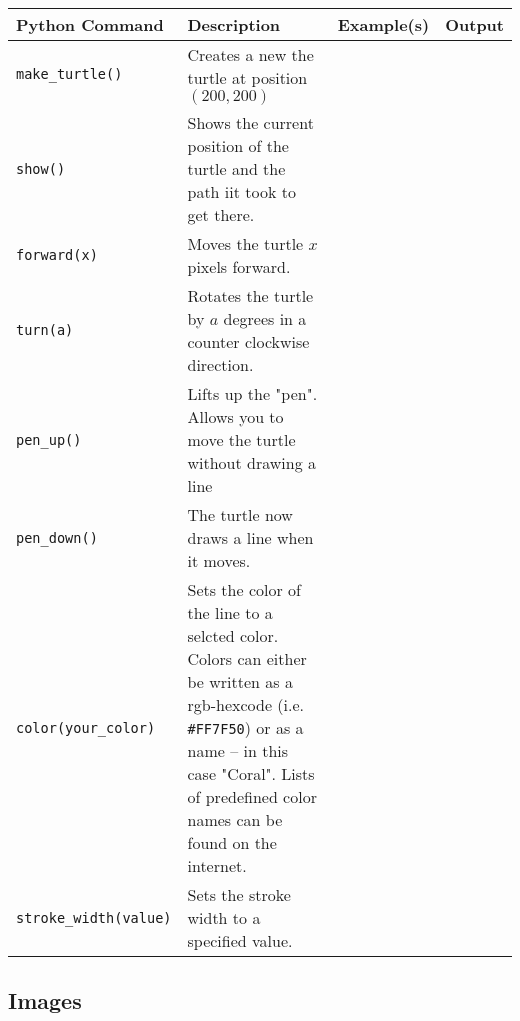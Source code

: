 \documentclass[11pt,a4paper]{report}
\begin{document}
\begin{longtable}{|p{}|p{}|p{}|p{}|}
\hline
Python Command & Description & Example(s) & Output  \\
\hline 
\endhead

\lstinline|make_turtle()| & Creates a new the turtle at position $(200,200)$ && \\
\hline
\lstinline|show()| & Shows the current position of the turtle and the path iit took to get there. &&\\
\hline
\lstinline|forward(x)| & Moves the turtle $x$ pixels forward. && \\
\hline
\lstinline|turn(a)| & Rotates the turtle by $a$ degrees in a counter clockwise direction. && \\
\hline
\lstinline|pen_up()| & Lifts up the "pen". Allows you to move the turtle without drawing a line && \\
\hline
\lstinline|pen_down()| & The turtle now draws a line when it moves. &&\\
\hline
\lstinline|color(your_color)| & Sets the color of the line to a selcted color. Colors can either be written as a rgb-hexcode (i.e. \verb|#FF7F50|) or as a name -- in this case "Coral". Lists of predefined color names can be found on the internet. &&\\
\hline
\lstinline|stroke_width(value)| & Sets the stroke width to a specified value. &&\\
\hline
\end{longtable}


\subsection{Images}
\end{document}
